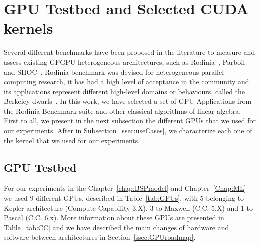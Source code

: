 \section{GPU Testbed and Selected CUDA kernels} \label{sec:methodChar}
Several different benchmarks have been proposed in the literature to measure and assess existing GPGPU heterogeneous architectures, such as Rodinia~\citep{Rodinia:Che:2009}, Parboil~\citep{Stratton:2012:Parboil} and SHOC~\citep{Danalis:2010:SHOC}. Rodinia benchmark was devised for heterogeneous parallel computing research, it has had a high level of acceptance in the community and its applications represent different high-level domains or behaviours,  called the Berkeley dwarfs~\cite{asanovic2009dwarfs}. In this work, we have selected  a set of GPU Applications from the Rodinia Benchmark suite and  other classical algorithms of linear algebra. First to all, we present in the next subsection the different GPUs that we used for our experiments. After in Subsection~\ref{ssec:useCases}, we characterize each one of the kernel that we used for our experiments.



\subsection{GPU Testbed}\label{ssec:GPUTestbed}
For our experiments in the Chapter~\ref{chap:BSPmodel} and Chapter~\ref{Chap:ML} we used 9 different GPUs, described in Table~\ref{tab:GPUs}, with 5 belonging to Kepler architecture (Compute Capability 3.X), 3 to Maxwell (C.C. 5.X) and 1 to Pascal (C.C. 6.x). More information about these GPUs are presented in Table~\ref{tab:CC} and we have described the main changes of hardware and software between architectures in Section~\ref{ssec:GPUroadmap}. 


